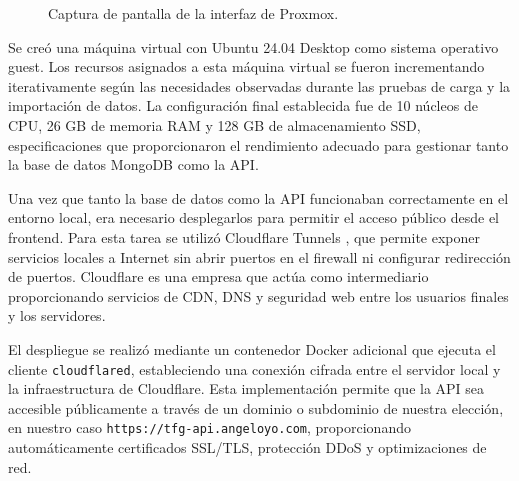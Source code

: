\begin{figure}[H]
  \centering
  \caption{Captura de pantalla de la interfaz de Proxmox.}
  \label{fig:proxmox2}
\end{figure}



Se creó una máquina virtual con Ubuntu 24.04 Desktop como sistema operativo guest. Los recursos asignados a esta máquina virtual se fueron incrementando iterativamente según las necesidades observadas durante las pruebas de carga y la importación de datos. La configuración final establecida fue de 10 núcleos de CPU, 26 GB de memoria RAM y 128 GB de almacenamiento SSD, especificaciones que proporcionaron el rendimiento adecuado para gestionar tanto la base de datos MongoDB como la API.

Una vez que tanto la base de datos como la API funcionaban correctamente en el entorno local, era necesario desplegarlos para permitir el acceso público desde el frontend. Para esta tarea se utilizó Cloudflare Tunnels \cite{cloudflaretunnels}, que permite exponer servicios locales a Internet sin abrir puertos en el firewall ni configurar redirección de puertos. Cloudflare \cite{cloudflare} es una empresa que actúa como intermediario proporcionando servicios de CDN, DNS y seguridad web entre los usuarios finales y los servidores.

El despliegue se realizó mediante un contenedor Docker adicional que ejecuta el cliente \texttt{cloudflared}, estableciendo una conexión cifrada entre el servidor local y la infraestructura de Cloudflare. Esta implementación permite que la API sea accesible públicamente a través de un dominio o subdominio de nuestra elección, en nuestro caso \texttt{https://tfg-api.angeloyo.com}, proporcionando automáticamente certificados SSL/TLS, protección DDoS y optimizaciones de red.

